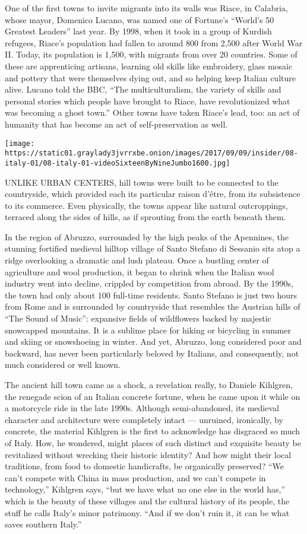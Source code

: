One of the first towns to invite migrants into its walls was Riace, in
Calabria, whose mayor, Domenico Lucano, was named one of Fortune's
``World's 50 Greatest Leaders'' last year. By 1998, when it took in a
group of Kurdish refugees, Riace's population had fallen to around 800
from 2,500 after World War II. Today, its population is 1,500, with
migrants from over 20 countries. Some of these are apprenticing
artisans, learning old skills like embroidery, glass mosaic and pottery
that were themselves dying out, and so helping keep Italian culture
alive. Lucano told the BBC, ``The multiculturalism, the variety of
skills and personal stories which people have brought to Riace, have
revolutionized what was becoming a ghost town.'' Other towns have taken
Riace's lead, too: an act of humanity that has become an act of
self-preservation as well.

\texttt{[image: https://static01.graylady3jvrrxbe.onion/images/2017/09/09/insider/08-italy-01/08-italy-01-videoSixteenByNineJumbo1600.jpg]}

UNLIKE URBAN CENTERS, hill towns were built to be connected to the
countryside, which provided each its particular raison d'être, from its
subsistence to its commerce. Even physically, the towns appear like
natural outcroppings, terraced along the sides of hills, as if sprouting
from the earth beneath them.

In the region of Abruzzo, surrounded by the high peaks of the Apennines,
the stunning fortified medieval hilltop village of Santo Stefano di
Sessanio sits atop a ridge overlooking a dramatic and lush plateau. Once
a bustling center of agriculture and wool production, it began to shrink
when the Italian wool industry went into decline, crippled by
competition from abroad. By the 1990s, the town had only about 100
full-time residents. Santo Stefano is just two hours from Rome and is
surrounded by countryside that resembles the Austrian hills of ``The
Sound of Music'': expansive fields of wildflowers backed by majestic
snowcapped mountains. It is a sublime place for hiking or bicycling in
summer and skiing or snowshoeing in winter. And yet, Abruzzo, long
considered poor and backward, has never been particularly beloved by
Italians, and consequently, not much considered or well known.

The ancient hill town came as a shock, a revelation really, to Daniele
Kihlgren, the renegade scion of an Italian concrete fortune, when he
came upon it while on a motorcycle ride in the late 1990s. Although
semi-abandoned, its medieval character and architecture were completely
intact --- unruined, ironically, by concrete, the material Kihlgren is
the first to acknowledge has disgraced so much of Italy. How, he
wondered, might places of such distinct and exquisite beauty be
revitalized without wrecking their historic identity? And how might
their local traditions, from food to domestic handicrafts, be
organically preserved? ``We can't compete with China in mass production,
and we can't compete in technology,'' Kihlgren says, ``but we have what
no one else in the world has,'' which is the beauty of these villages
and the cultural history of its people, the stuff he calls Italy's minor
patrimony. ``And if we don't ruin it, it can be what saves southern
Italy.''


